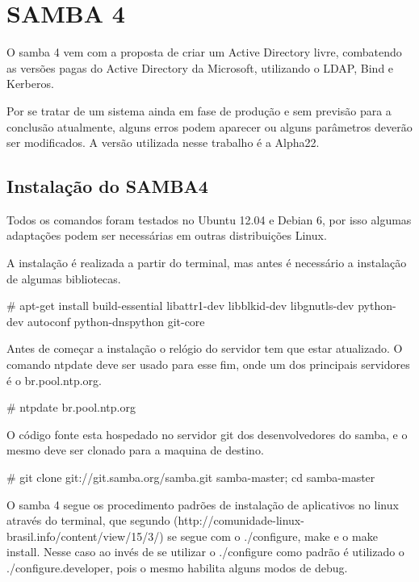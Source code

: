 \chapter{SAMBA 4}

O samba 4 vem com a proposta de criar um Active Directory livre, combatendo as versões pagas do Active Directory da Microsoft, utilizando o LDAP, Bind e Kerberos.

Por se tratar de um sistema ainda em fase de produção e sem previsão para a conclusão atualmente, alguns erros podem aparecer ou alguns parâmetros deverão ser modificados. A versão utilizada nesse trabalho é a Alpha22.

\section{Instalação do SAMBA4}

Todos os comandos foram testados no Ubuntu 12.04 e Debian 6, por isso algumas adaptações podem ser necessárias em outras distribuições Linux.

A instalação é realizada a partir do terminal, mas antes é necessário a instalação de algumas bibliotecas.

\# apt-get install build-essential libattr1-dev libblkid-dev libgnutls-dev python-dev autoconf python-dnspython git-core

Antes de começar a instalação o relógio do servidor tem que estar atualizado. O comando ntpdate deve ser usado para esse fim, onde um dos principais servidores é o br.pool.ntp.org.

\# ntpdate br.pool.ntp.org



O código fonte esta hospedado no servidor git dos desenvolvedores do samba, e o mesmo deve ser clonado para a maquina de destino.

\# git clone git://git.samba.org/samba.git samba-master; cd samba-master

O samba 4 segue os procedimento padrões de instalação de aplicativos no linux através do terminal, que segundo (http://comunidade-linux-brasil.info/content/view/15/3/) se segue com o ./configure, make e o make install.
Nesse caso ao invés de se utilizar o ./configure como padrão é utilizado o ./configure.developer, pois o mesmo habilita alguns modos de debug.

